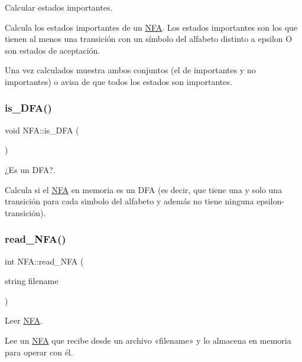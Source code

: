 Calcular estados importantes. 

Calcula los estados importantes de un \mbox{\hyperlink{class_n_f_a}{N\+FA}}. Los estados importantes son los que tienen al menos una transición con un símbolo del alfabeto distinto a epsilon O son estados de aceptación.

Una vez calculados muestra ambos conjuntos (el de importantes y no importantes) o avisa de que todos los estados son importantes. \mbox{\label{class_n_f_a_a36415a14d2ffcd179ff3a2f96b80da0d}} 
\subsubsection{\texorpdfstring{is\+\_\+\+D\+F\+A()}{is\_DFA()}}
{\footnotesize\ttfamily void N\+F\+A\+::is\+\_\+\+D\+FA (\begin{DoxyParamCaption}{ }\end{DoxyParamCaption})}



¿\+Es un D\+FA?. 

Calcula si el \mbox{\hyperlink{class_n_f_a}{N\+FA}} en memoria es un D\+FA (es decir, que tiene una y solo una transición para cada simbolo del alfabeto y además no tiene ninguna epsilon-\/transición). \mbox{\label{class_n_f_a_a694ab54b829fb1d45ec8bb752a0c31a0}} 
\subsubsection{\texorpdfstring{read\+\_\+\+N\+F\+A()}{read\_NFA()}}
{\footnotesize\ttfamily int N\+F\+A\+::read\+\_\+\+N\+FA (\begin{DoxyParamCaption}\item[{string}]{filename }\end{DoxyParamCaption})}



Leer \mbox{\hyperlink{class_n_f_a}{N\+FA}}. 

Lee un \mbox{\hyperlink{class_n_f_a}{N\+FA}} que recibe desde un archivo «filename» y lo almacena en memoria para operar con él. \mbox{\label{class_n_f_a_a53a6b0ddcfb706dc4725cf2a6a8f2388}} 
